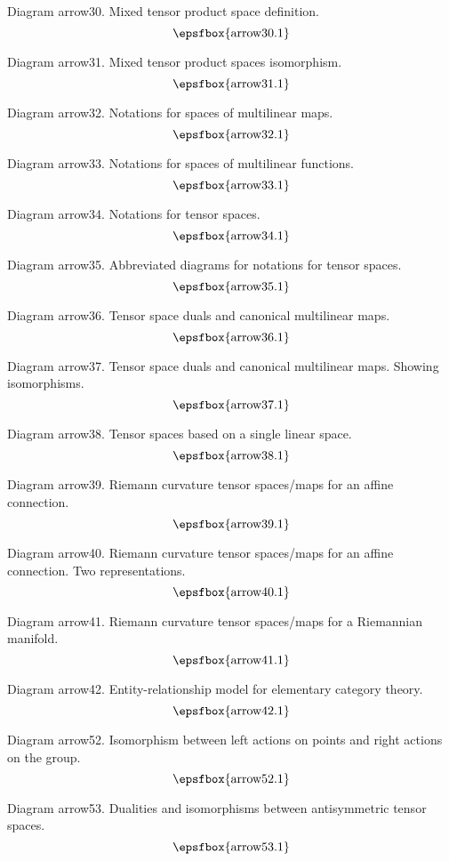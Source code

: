Diagram arrow30. Mixed tensor product space definition.
$$
\centerline{\epsfbox{arrow30.1}}
$$

Diagram arrow31. Mixed tensor product spaces isomorphism.
$$
\centerline{\epsfbox{arrow31.1}}
$$

\filleject

Diagram arrow32. Notations for spaces of multilinear maps.
$$
\centerline{\epsfbox{arrow32.1}}
$$

Diagram arrow33. Notations for spaces of multilinear functions.
$$
\centerline{\epsfbox{arrow33.1}}
$$

Diagram arrow34. Notations for tensor spaces.
$$
\centerline{\epsfbox{arrow34.1}}
$$

Diagram arrow35. Abbreviated diagrams for notations for tensor spaces.
$$
\centerline{\epsfbox{arrow35.1}}
$$

Diagram arrow36. Tensor space duals and canonical multilinear maps.
$$
\centerline{\epsfbox{arrow36.1}}
$$

\filleject

Diagram arrow37. Tensor space duals and canonical multilinear maps. Showing
isomorphisms.
$$
\centerline{\epsfbox{arrow37.1}}
$$

Diagram arrow38. Tensor spaces based on a single linear space.
$$
\centerline{\epsfbox{arrow38.1}}
$$

Diagram arrow39. Riemann curvature tensor spaces/maps for an affine connection.
$$
\centerline{\epsfbox{arrow39.1}}
$$

Diagram arrow40. Riemann curvature tensor spaces/maps for an affine connection.
Two representations.
$$
\centerline{\epsfbox{arrow40.1}}
$$

\filleject

Diagram arrow41. Riemann curvature tensor spaces/maps for a Riemannian manifold.
$$
\centerline{\epsfbox{arrow41.1}}
$$

Diagram arrow42. Entity-relationship model for elementary category theory.
$$
\centerline{\epsfbox{arrow42.1}}
$$

Diagram arrow52. Isomorphism between left actions on points and right actions on
the group.
$$
\centerline{\epsfbox{arrow52.1}}
$$

Diagram arrow53. Dualities and isomorphisms between antisymmetric tensor spaces.
$$
\centerline{\epsfbox{arrow53.1}}
$$

